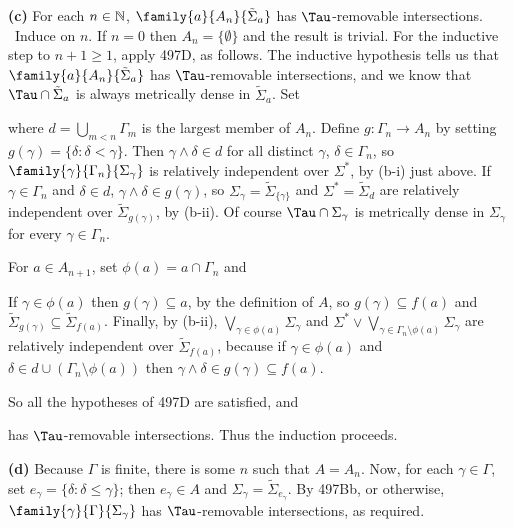 {\medskip

{\bf (c)} For each $n\in\Bbb N$, $\family{a}{A_n}{\tilde\Sigma_a}$ has
$\Tau$-removable intersections.   \Prf\ Induce on $n$.   If $n=0$ then
$A_n=\{\emptyset\}$ and the result is trivial.   For the inductive step to
$n+1\ge 1$, apply 497D, as follows.   The inductive hypothesis tells
us that $\family{a}{A_n}{\tilde\Sigma_{a}}$ has $\Tau$-removable
intersections, and we know that
$\Tau\cap\tilde\Sigma_{a}$ is always metrically dense in
$\tilde\Sigma_a$.   Set


\noindent where $d=\bigcup_{m<n}\Gamma_m$
is the largest member of $A_n$.   Define $g:\Gamma_n\to A_n$ by setting
$g(\gamma)=\{\delta:\delta<\gamma\}$.   Then $\gamma\wedge\delta\in d$ for
all distinct $\gamma$, $\delta\in\Gamma_n$, so
$\family{\gamma}{\Gamma_n}{\Sigma_{\gamma}}$ is relatively independent over
$\Sigma^*$, by (b-i) just above.   If $\gamma\in\Gamma_n$ and
$\delta\in d$, $\gamma\wedge\delta\in g(\gamma)$, so
$\Sigma_{\gamma}=\tilde\Sigma_{\{\gamma\}}$ and
$\Sigma^*=\tilde\Sigma_d$ are relatively independent over
$\tilde\Sigma_{g(\gamma)}$, by (b-ii).
Of course $\Tau\cap\Sigma_{\gamma}$ is
metrically dense in $\Sigma_{\gamma}$ for every $\gamma\in\Gamma_n$.

For $a\in A_{n+1}$, set $\phi(a)=a\cap\Gamma_n$ and


\noindent If $\gamma\in\phi(a)$
then $g(\gamma)\subseteq a$, by the definition of $A$, so
$g(\gamma)\subseteq f(a)$ and
$\tilde\Sigma_{g(\gamma)}\subseteq\tilde\Sigma_{f(a)}$.   Finally, by
(b-ii), $\bigvee_{\gamma\in\phi(a)}\Sigma_{\gamma}$ and
$\Sigma^*\vee\bigvee_{\gamma\in\Gamma_n\setminus\phi(a)}\Sigma_{\gamma}$
are relatively independent over $\tilde\Sigma_{f(a)}$, because if
$\gamma\in\phi(a)$ and $\delta\in d\cup(\Gamma_n\setminus\phi(a))$ then
$\gamma\wedge\delta\in g(\gamma)\subseteq f(a)$.

So all the hypotheses of 497D are satisfied, and


\noindent has $\Tau$-removable intersections.   Thus the induction
proceeds.\ \Qed

\medskip

{\bf (d)} Because $\Gamma$ is finite, there is some $n$ such that $A=A_n$.
Now, for each $\gamma\in\Gamma$, set
$e_{\gamma}=\{\delta:\delta\le\gamma\}$;  then $e_{\gamma}\in A$ and
$\Sigma_{\gamma}=\tilde\Sigma_{e_{\gamma}}$.
By 497Bb, or otherwise,
$\family{\gamma}{\Gamma}{\Sigma_{\gamma}}$ has $\Tau$-removable
intersections, as required.

}
